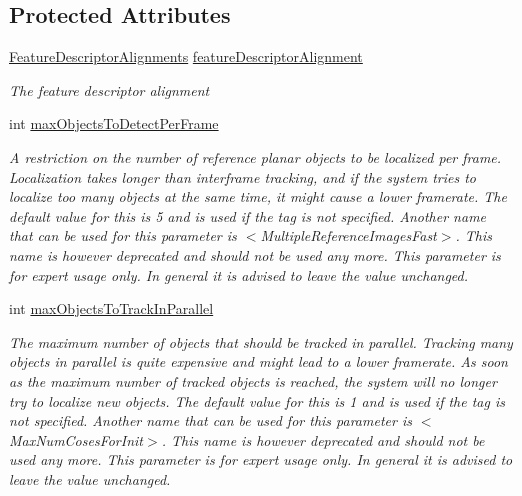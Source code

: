 \subsection*{Protected Attributes}
\begin{DoxyCompactItemize}
\item 
\hyperlink{class_a_rdev_kit_1_1_model_1_1_project_1_1_markerless_sensor_a1c0b341ee16aa03d68b67714f1cfca53}{Feature\-Descriptor\-Alignments} \hyperlink{class_a_rdev_kit_1_1_model_1_1_project_1_1_markerless_sensor_aa6e040afed0bb46eb2c0fcda8954c1e1}{feature\-Descriptor\-Alignment}
\begin{DoxyCompactList}\small\item\em The feature descriptor alignment \end{DoxyCompactList}\item 
int \hyperlink{class_a_rdev_kit_1_1_model_1_1_project_1_1_markerless_sensor_a49898575f95f56a267a82cca2b258134}{max\-Objects\-To\-Detect\-Per\-Frame}
\begin{DoxyCompactList}\small\item\em A restriction on the number of reference planar objects to be localized per frame. Localization takes longer than interframe tracking, and if the system tries to localize too many objects at the same time, it might cause a lower framerate. The default value for this is 5 and is used if the tag is not specified. Another name that can be used for this parameter is $<$Multiple\-Reference\-Images\-Fast$>$. This name is however deprecated and should not be used any more. This parameter is for expert usage only. In general it is advised to leave the value unchanged. \end{DoxyCompactList}\item 
int \hyperlink{class_a_rdev_kit_1_1_model_1_1_project_1_1_markerless_sensor_a8c9de52d508a5cb8adf1920438c5f6cb}{max\-Objects\-To\-Track\-In\-Parallel}
\begin{DoxyCompactList}\small\item\em The maximum number of objects that should be tracked in parallel. Tracking many objects in parallel is quite expensive and might lead to a lower framerate. As soon as the maximum number of tracked objects is reached, the system will no longer try to localize new objects. The default value for this is 1 and is used if the tag is not specified. Another name that can be used for this parameter is $<$Max\-Num\-Coses\-For\-Init$>$. This name is however deprecated and should not be used any more. This parameter is for expert usage only. In general it is advised to leave the value unchanged. \end{DoxyCompactList}\item 

\end{DoxyCompactItemize}
